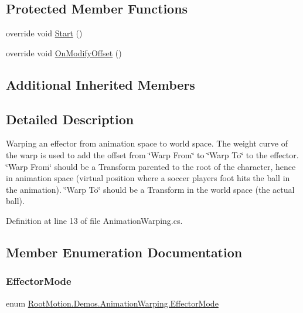 \subsection*{Protected Member Functions}
\begin{DoxyCompactItemize}
\item 
override void \mbox{\hyperlink{class_root_motion_1_1_demos_1_1_animation_warping_a241d2322b0ebf23fac16d77ee0c632ed}{Start}} ()
\item 
override void \mbox{\hyperlink{class_root_motion_1_1_demos_1_1_animation_warping_adae5cbd4af0d90ea0084eb5c0c689dc7}{On\+Modify\+Offset}} ()
\end{DoxyCompactItemize}
\subsection*{Additional Inherited Members}


\subsection{Detailed Description}
Warping an effector from animation space to world space. The weight curve of the warp is used to add the offset from \char`\"{}\+Warp From\char`\"{} to \char`\"{}\+Warp To\char`\"{} to the effector. \char`\"{}\+Warp From\char`\"{} should be a Transform parented to the root of the character, hence in animation space (virtual position where a soccer player\textquotesingle{}s foot hits the ball in the animation). \char`\"{}\+Warp To\char`\"{} should be a Transform in the world space (the actual ball). 



Definition at line 13 of file Animation\+Warping.\+cs.



\subsection{Member Enumeration Documentation}
\mbox{\label{class_root_motion_1_1_demos_1_1_animation_warping_a123d7f3cfdbea0d8a48c0d4e0e36a155}} 
\subsubsection{\texorpdfstring{Effector\+Mode}{EffectorMode}}
{\footnotesize\ttfamily enum \mbox{\hyperlink{class_root_motion_1_1_demos_1_1_animation_warping_a123d7f3cfdbea0d8a48c0d4e0e36a155}{Root\+Motion.\+Demos.\+Animation\+Warping.\+Effector\+Mode}}\hspace{0.3cm}{\ttfamily [strong]}}



